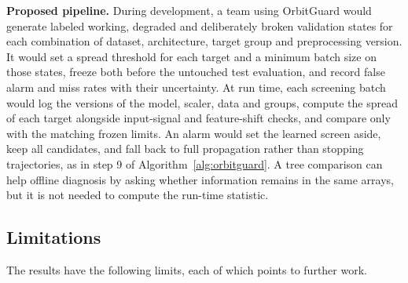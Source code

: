 \textbf{Proposed pipeline.} During development, a team using OrbitGuard would generate labeled working, degraded and deliberately broken validation states for each combination of dataset, architecture, target group and preprocessing version. It would set a spread threshold for each target and a minimum batch size on those states, freeze both before the untouched test evaluation, and record false alarm and miss rates with their uncertainty. At run time, each screening batch would log the versions of the model, scaler, data and groups, compute the spread of each target alongside input-signal and feature-shift checks, and compare only with the matching frozen limits. An alarm would set the learned screen aside, keep all candidates, and fall back to full propagation rather than stopping trajectories, as in step 9 of Algorithm~\ref{alg:orbitguard}. A tree comparison can help offline diagnosis by asking whether information remains in the same arrays, but it is not needed to compute the run-time statistic.

\subsection{Limitations}
\label{sec:limits}

The results have the following limits, each of which points to further work.

